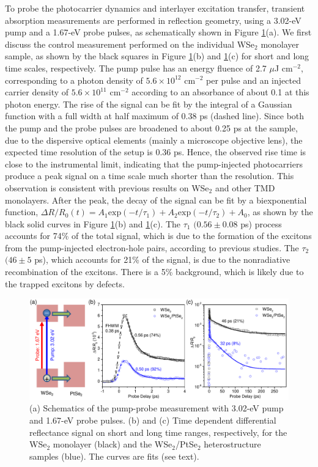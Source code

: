 \documentclass[10pt]{iopart}
\begin{document}
To probe the photocarrier dynamics and interlayer excitation transfer, transient absorption measurements are performed in reflection geometry, using a 3.02-eV pump and a 1.67-eV probe pulses, as schematically shown in Figure \ref{fig:410743}(a). We first discuss the control measurement performed on the individual WSe$_2$ monolayer sample, as shown by the black squares in Figure \ref{fig:410743}(b) and \ref{fig:410743}(c) for short and long time scales, respectively. The pump pulse has an energy fluence of 2.7 $\mu$J cm$^{-2}$, corresponding to a photon density of $5.6 \times 10^{12}$ cm$^{-2}$ per pulse and an injected carrier density of $5.6 \times 10^{11}$ cm$^{-2}$ according to an absorbance of about 0.1 at this photon energy\cite{li2014measurement}. The rise of the signal can be fit by the integral of a Gaussian function with a full width at half maximum of 0.38 ps (dashed line). Since both the pump and the probe pulses are broadened to about 0.25 ps at the sample, due to the dispersive optical elements (mainly a microscope objective lens), the expected time resolution of the setup is 0.36 ps. Hence, the observed rise time is close to the instrumental limit, indicating that the pump-injected photocarriers produce a peak signal on a time scale much shorter than the resolution. This observation is consistent with previous results on WSe$_2$ \cite{cui2014transient} and other TMD monolayers\cite{nie2014ultrafast}. After the peak, the decay of the signal can be fit by a biexponential function, $\Delta R/R_0 (t) = A_1 \mathrm{exp}(-t/\tau_1) + A_2 \mathrm{exp}(-t/\tau_2) +A_0$, as shown by the black solid curves in Figure \ref{fig:410743}(b) and \ref{fig:410743}(c). The $\tau_1$ $(0.56 \pm 0.08$ ps) process accounts for 74\% of the total signal, which is due to the formation of the excitons from the pump-injected electron-hole pairs, according to previous studies\cite{ceballos2016exciton,steinleitner2017direct}. The $\tau_2$ $(46 \pm 5$ ps), which accounts for  21\% of the signal, is due to the nonradiative recombination of the excitons\cite{nie2014ultrafast,yan2014photoluminescence}.  There is a 5\% background, which is likely due to the trapped excitons by defects. 

\begin{figure}[ht]
  \centering
  \includegraphics[width=16cm]{410743.pdf}
  \caption{(a) Schematics of the pump-probe measurement with 3.02-eV pump and 1.67-eV probe pulses. (b) and (c) Time dependent differential reflectance signal on short and long time ranges, respectively, for the WSe$_2$ monolayer (black) and the WSe$_2$/PtSe$_2$ heterostructure samples (blue). The curves are fits (see text).}
    \label{fig:410743}
\end{figure}
\end{document}
